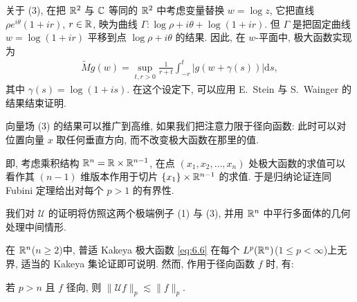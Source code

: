 关于 (3), 在把 $\mathbb{R}^2$ 与 $\mathbb{C}$ 等同的 $\mathbb{R}^2$ 中考虑变量替换 $w = \log z$, 它把直线 $\rho e^{i\theta}(1 + ir)$, $r \in \mathbb{R}$, 映为曲线 $\Gamma: \log\rho + i\theta + \log(1 + ir)$. 但 $\Gamma$ 是把固定曲线 $w = \log(1 + ir)$ 平移到点 $\log\rho + i\theta$ 的结果. 因此, 在 $w$-平面中, 极大函数实现为
\begin{align*}
  \widetilde{M}g(w)=\sup_{t,r>0}\frac{1}{r+t}\int_{-r}^{t}\left|g(w+\gamma(s))\right|\mathrm{d}s,
\end{align*}
其中 $\gamma(s) = \log(1 + is)$. 在这个设定下, 可以应用 E.~Stein 与 S.~Wainger \cite{b126} 的结果结束证明.

向量场 (3) 的结果可以推广到高维, 如果我们把注意力限于径向函数: 此时可以对位置向量 $x$ 取任何垂直方向, 而不改变极大函数在那里的值.

即, 考虑乘积结构 $\mathbb{R}^n = \mathbb{R} \times \mathbb{R}^{n-1}$, 在点 $(x_1, x_2, \ldots, x_n)$ 处极大函数的求值可以看作其 $(n-1)$ 维版本作用于切片 $\{x_1\} \times \mathbb{R}^{n-1}$ 的求值. 于是归纳论证连同 Fubini 定理给出对每个 $p > 1$ 的有界性.

我们对 $\mathcal{U}$ 的证明将仿照这两个极端例子 (1) 与 (3), 并用 $\mathbb{R}^n$ 中平行多面体的几何处理中间情形.

在 $\mathbb{R}^n$($n \geq 2$)中, 普适 Kakeya 极大函数 \eqref{eq:6.6} 在每个 $L^p(\mathbb{R}^n)$($1 \leq p < \infty$)上无界, 适当的 Kakeya 集论证即可说明. 然而, 作用于径向函数 $f$ 时, 有:

\begin{proposition}\label{prop:6.9}
若 $p > n$ 且 $f$ 径向, 则 $\|\mathcal{U}f\|_{p} \lesssim \|f\|_{p}$.
\end{proposition}

